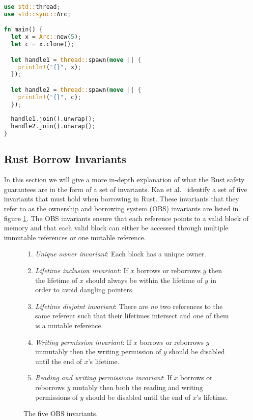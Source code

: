 \begin{lstlisting}[language=Rust,frame=single,caption=Threading in Rust,label=code:thread]
use std::thread;
use std::sync::Arc;

fn main() {
  let x = Arc::new(5);
  let c = x.clone();

  let handle1 = thread::spawn(move || {
    println!("{}", x);
  });

  let handle2 = thread::spawn(move || {
    println!("{}", c);
  });
  
  handle1.join().unwrap();
  handle2.join().unwrap();
}
\end{lstlisting}

\subsection{Rust Borrow Invariants}
\label{sec:obsinvariants}
In this section we will give a more in-depth explanation of what the Rust safety guarantees are in the form of a set of invariants.
Kan et al.\  \cite{Kan2018AnEO} identify a set of five invariants that must hold when borrowing in Rust.
These invariants that they refer to as the ownership and borrowing system (OBS) invariants are listed in figure \ref{fig:obsinvariants}.
The OBS invariants ensure that each reference points to a valid block of memory and that each valid block can either be accessed through multiple immutable references or one mutable reference.

\begin{figure}[h]
\centering
\begin{enumerate}
    \item \textit{Unique owner invariant}: Each block has a unique owner.
    \item \textit{Lifetime inclusion invariant}: If $x$ borrows or reborrows $y$ then the lifetime of $x$ should always be within the lifetime of $y$ in order to avoid dangling pointers.
    \item \textit{Lifetime disjoint invariant}: There are \textit{no} two references to the same referent such that their lifetimes intersect and one of them is a mutable reference.
    \item \textit{Writing permission invariant}: If $x$ borrows or reborrows $y$ immutably then the writing permission of $y$ should be disabled until the end of $x$'s lifetime.
    \item \textit{Reading and writing permissions invariant}: If $x$ borrows or reborrows $y$ mutably then both the reading and writing permissions of $y$ should be disabled until the end of $x$'s lifetime.
\end{enumerate}
\caption{The five OBS invariants.\cite{Kan2018AnEO}}
\label{fig:obsinvariants}
\end{figure}

